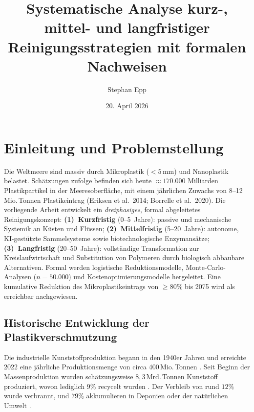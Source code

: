 ﻿\documentclass[12pt,a4paper]{article}
\title{Systematische Analyse kurz-, mittel- und langfristiger\\
Reinigungsstrategien mit formalen Nachweisen}
\author{Stephan Epp}
\date{20. April 2026}
\theoremstyle{definition}
\theoremstyle{remark}
\begin{document}
\maketitle
\tableofcontents
\newpage

\section{Einleitung und Problemstellung}
Die Weltmeere sind massiv durch Mikroplastik ($< 5$\,mm) und Nanoplastik belastet.
Sch\"atzungen zufolge befinden sich heute \(\approx 170{.}000\) Milliarden
Plastikpartikel in der Meeresoberfl\"ache, mit einem j\"ahrlichen Zuwachs von
8--12\,Mio.\,Tonnen Plastikeintrag (Eriksen et al.\ 2014; Borrelle et al.\ 2020).
Die vorliegende Arbeit entwickelt ein \emph{dreiphasiges}, formal abgeleitetes
Reinigungskonzept: \textbf{(1)~Kurzfristig} (0--5~Jahre): passive und mechanische
Systemik an K\"usten und Fl\"ussen; \textbf{(2)~Mittelfristig} (5--20~Jahre):
autonome, KI-gest\"utzte Sammelsysteme sowie biotechnologische Enzymans\"atze;
\textbf{(3)~Langfristig} (20--50~Jahre): vollst\"andige Transformation zur
Kreislaufwirtschaft und Substitution von Polymeren durch biologisch abbaubare
Alternativen.  Formal werden logistische Reduktionsmodelle, Monte-Carlo-Analysen
($n=50{.}000$) und Kostenoptimierungsmodelle hergeleitet.
Eine kumulative Reduktion des Mikroplastikeintrags von $\geq 80\%$ bis 2075
wird als erreichbar nachgewiesen.

\subsection{Historische Entwicklung der Plastikverschmutzung}

Die industrielle Kunststoffproduktion begann in den 1940er Jahren und erreichte
2022 eine j\"ahrliche Produktionsmenge von circa 400\,Mio.\,Tonnen
\cite{plasticeurope2023}. Seit Beginn der Massenproduktion wurden sch\"atzungsweise
$8{,}3\,$Mrd.\,Tonnen Kunststoff produziert, wovon lediglich $9\%$
recycelt wurden \cite{geyer2017production}. Der Verbleib von rund $12\%$
wurde verbrannt, und $79\%$ akkumulieren in Deponien oder der nat\"urlichen
Umwelt \cite{geyer2017production}.
\end{document}
